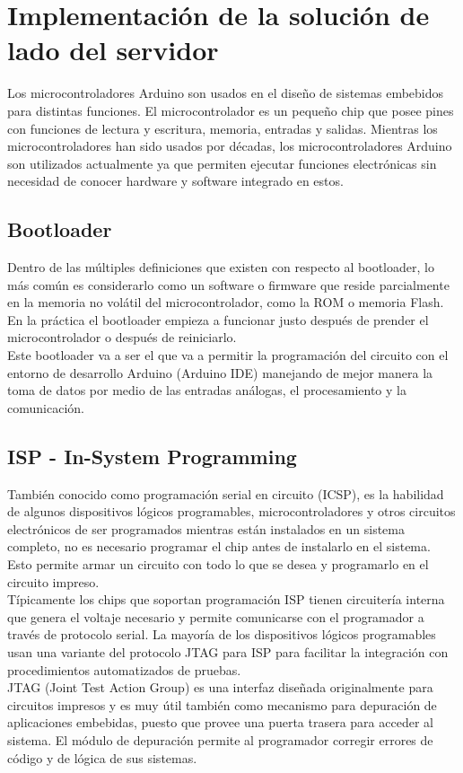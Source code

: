 \chapter{Implementación de la solución de lado del servidor}\label{servidor}
Los microcontroladores Arduino son usados en el diseño de sistemas embebidos para distintas funciones. El microcontrolador es un pequeño chip que posee pines con funciones de lectura y escritura, memoria, entradas y salidas. Mientras los microcontroladores han sido usados por décadas, los microcontroladores Arduino son utilizados actualmente ya que permiten ejecutar funciones electrónicas sin necesidad de conocer hardware y software integrado en estos. 
\section{Bootloader}
Dentro de las múltiples definiciones que existen con respecto al bootloader, lo más común es considerarlo como un software o firmware que reside parcialmente en la memoria no volátil del microcontrolador, como la ROM o memoria Flash. \\
En la práctica el bootloader empieza a funcionar justo después de prender el microcontrolador o después de reiniciarlo. \\
Este bootloader va a ser el que va a permitir la programación del circuito con el entorno de desarrollo Arduino (Arduino IDE) manejando de mejor manera la toma de datos por medio de las entradas análogas, el procesamiento y la comunicación.

\newpage
\section{ISP - In-System Programming}
También conocido como programación serial en circuito\cite{isp} (ICSP), es la habilidad de algunos dispositivos lógicos programables, microcontroladores y otros circuitos electrónicos de ser programados mientras están instalados en un sistema completo, no es necesario programar el chip antes de instalarlo en el sistema. Esto permite armar un circuito con todo lo que se desea y programarlo en el circuito impreso.\\
Típicamente los chips que soportan programación ISP tienen circuitería interna que genera el voltaje necesario y permite comunicarse con el programador a través de protocolo serial.
La mayoría de los dispositivos lógicos programables usan una variante del protocolo JTAG para ISP para facilitar la integración con procedimientos automatizados de pruebas.\\
JTAG (Joint Test Action Group) es una interfaz diseñada originalmente para circuitos impresos y es muy útil también como mecanismo para depuración de aplicaciones embebidas, puesto que provee una puerta trasera para acceder al sistema. El módulo de depuración permite al programador corregir errores de código y de lógica de sus sistemas.\\

